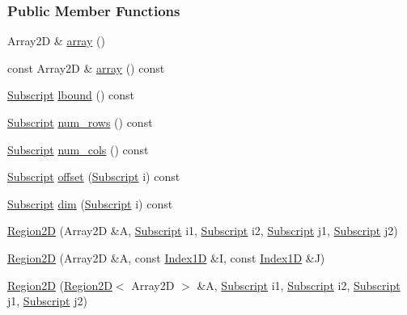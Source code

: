 \subsubsection*{Public Member Functions}
\begin{DoxyCompactItemize}
\item 
Array2D \& \hyperlink{class_t_n_t_1_1_region2_d_a871e94419f2516d5006e6a4a2f6ba6a4}{array} ()
\item 
const Array2D \& \hyperlink{class_t_n_t_1_1_region2_d_aa1e7d187c09aee496e839427939bfa9d}{array} () const 
\item 
\hyperlink{namespace_t_n_t_af22e3f1460e145c04ce4e7d701e4c1c1}{Subscript} \hyperlink{class_t_n_t_1_1_region2_d_aa404255788aab9edb3d979052334b6ec}{lbound} () const 
\item 
\hyperlink{namespace_t_n_t_af22e3f1460e145c04ce4e7d701e4c1c1}{Subscript} \hyperlink{class_t_n_t_1_1_region2_d_a0f171e65fb73323aa0533a3e531adba3}{num\_\-rows} () const 
\item 
\hyperlink{namespace_t_n_t_af22e3f1460e145c04ce4e7d701e4c1c1}{Subscript} \hyperlink{class_t_n_t_1_1_region2_d_a6b0b6349c22f20cb82581778512a72f3}{num\_\-cols} () const 
\item 
\hyperlink{namespace_t_n_t_af22e3f1460e145c04ce4e7d701e4c1c1}{Subscript} \hyperlink{class_t_n_t_1_1_region2_d_a823ce86ddf42e3de3ad9977e5b7307d9}{offset} (\hyperlink{namespace_t_n_t_af22e3f1460e145c04ce4e7d701e4c1c1}{Subscript} i) const 
\item 
\hyperlink{namespace_t_n_t_af22e3f1460e145c04ce4e7d701e4c1c1}{Subscript} \hyperlink{class_t_n_t_1_1_region2_d_af92e0fb15f75d4f1e65b34dad8d51a90}{dim} (\hyperlink{namespace_t_n_t_af22e3f1460e145c04ce4e7d701e4c1c1}{Subscript} i) const 
\item 
\hyperlink{class_t_n_t_1_1_region2_d_a1160de6cb21abf9c2421dc9307565085}{Region2D} (Array2D \&A, \hyperlink{namespace_t_n_t_af22e3f1460e145c04ce4e7d701e4c1c1}{Subscript} i1, \hyperlink{namespace_t_n_t_af22e3f1460e145c04ce4e7d701e4c1c1}{Subscript} i2, \hyperlink{namespace_t_n_t_af22e3f1460e145c04ce4e7d701e4c1c1}{Subscript} j1, \hyperlink{namespace_t_n_t_af22e3f1460e145c04ce4e7d701e4c1c1}{Subscript} j2)
\item 
\hyperlink{class_t_n_t_1_1_region2_d_a1bf9546e46c53cef178604a90dbc6515}{Region2D} (Array2D \&A, const \hyperlink{class_t_n_t_1_1_index1_d}{Index1D} \&I, const \hyperlink{class_t_n_t_1_1_index1_d}{Index1D} \&J)
\item 
\hyperlink{class_t_n_t_1_1_region2_d_a6b6d0680f2081e5fe0fbd0bedf1eff40}{Region2D} (\hyperlink{class_t_n_t_1_1_region2_d}{Region2D}$<$ Array2D $>$ \&A, \hyperlink{namespace_t_n_t_af22e3f1460e145c04ce4e7d701e4c1c1}{Subscript} i1, \hyperlink{namespace_t_n_t_af22e3f1460e145c04ce4e7d701e4c1c1}{Subscript} i2, \hyperlink{namespace_t_n_t_af22e3f1460e145c04ce4e7d701e4c1c1}{Subscript} j1, \hyperlink{namespace_t_n_t_af22e3f1460e145c04ce4e7d701e4c1c1}{Subscript} j2)

\end{DoxyCompactItemize}
